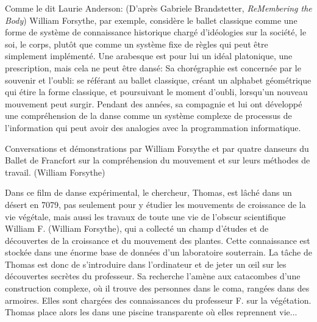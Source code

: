 {{Comme le dit Laurie Anderson: 
\blank
{} (D'apr\`es Gabriele Brandstetter,
{\em ReMembering the Body})
\blank
William Forsythe, par exemple, consid\`ere le ballet classique comme une
forme de syst\`eme de connaissance historique charg\'e
d'id\'eologies sur la soci\'et\'e, le soi, le corps,
plut\^ot que comme un syst\`eme fixe de r\`egles qui peut \^etre
simplement impl\'ement\'e. Une arabesque est pour lui un id\'eal
platonique, une prescription, mais cela ne peut \^etre dans\'e:  Sa chor\'egraphie est
concern\'ee par le souvenir et l'oubli: se
r\'ef\'erant au ballet classique, cr\'eant un alphabet g\'eom\'etrique
qui \'etire la forme classique, et poursuivant le moment
d'oubli, lorsqu'un nouveau mouvement peut surgir.
Pendant des ann\'ees, sa compagnie et lui ont d\'evelopp\'e une
compr\'ehension de la danse comme un syst\`eme complexe de processus de
l'information qui peut avoir des analogies avec la
programmation informatique.

 Conversations et d\'emonstrations par William Forsythe et par quatre
danseurs du Ballet de Francfort sur la compr\'ehension du mouvement et
sur leurs m\'ethodes de travail.  (William Forsythe)


Dans ce film de danse exp\'erimental, le chercheur, Thomas, est
l\^ach\'e dans un d\'esert en 7079, pas seulement pour y \'etudier les
mouvements de croissance de la vie v\'eg\'etale, mais aussi les travaux
de toute une vie de l'obscur scientifique William F.
(William Forsythe), qui a collect\'e un champ
d'\'etudes et de d\'ecouvertes de la croissance et du
mouvement des plantes. Cette connaissance est stock\'ee dans une
\'enorme base de donn\'ees d'un laboratoire
souterrain. La t\^ache de Thomas est donc de
s'introduire dans l'ordinateur et de
jeter un {\oe}il sur les d\'ecouvertes secr\`etes du professeur. Sa
recherche l'am\`ene aux catacombes d'une construction
complexe, o\`u il trouve des personnes dans le coma, rang\'ees dans des
armoires. Elles sont charg\'ees des connaissances du professeur F. sur
la v\'eg\'etation. Thomas place alors les  dans
une piscine transparente o\`u elles reprennent vie...

}}
